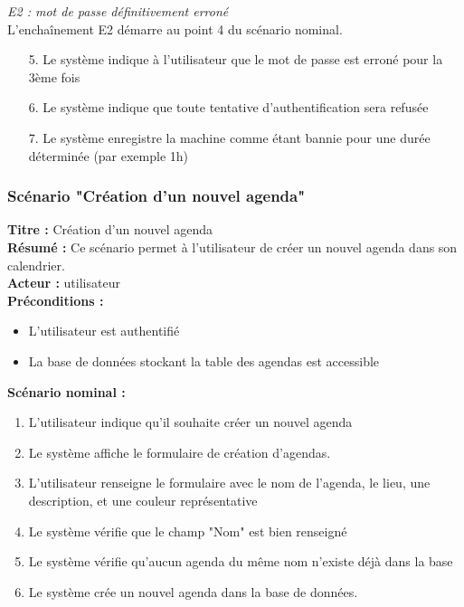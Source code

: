 \documentclass[12pt , a4paper]{article}
\begin{document}
\noindent\textit{E2 : mot de passe définitivement erroné}\\
L'encha\^inement E2 démarre au point 4 du scénario nominal.
\begin{enumerate}
\item[5.] Le système indique à l'utilisateur que le mot de passe est erroné pour la 3ème fois
\item[6.] Le système indique que toute tentative d'authentification sera refusée
\item[7.] Le système enregistre la machine comme étant bannie pour une durée déterminée (par exemple 1h)
\end{enumerate}


\subsubsection{Scénario "Création d'un nouvel agenda"}

\noindent\textbf{Titre : } Création d’un nouvel agenda\\
\textbf{Résumé : } Ce scénario permet à l’utilisateur de créer un nouvel agenda dans son calendrier.\\
\textbf{Acteur : }utilisateur\\

\noindent\textbf{Préconditions :}
\begin{itemize}
\item L'utilisateur est authentifié
\item La base de données stockant la table des agendas est accessible\\
\end{itemize}


\noindent\textbf{Scénario nominal :}
\begin{enumerate}
\item L’utilisateur indique qu'il souhaite créer un nouvel agenda 
\item Le système affiche le formulaire de création d’agendas.
\item L'utilisateur renseigne le formulaire avec le nom de l'agenda, le lieu, une description, et une couleur représentative
\item Le système vérifie que le champ "Nom" est bien renseigné
\item Le système vérifie qu’aucun agenda du même nom n’existe déjà dans la base
\item Le système crée un nouvel agenda dans la base de données.\\
\end{enumerate}
\end{document}
